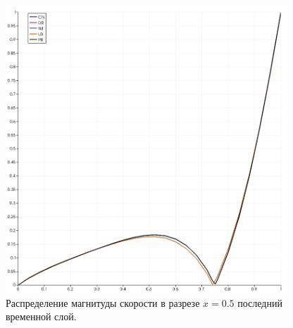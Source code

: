 \documentclass[12pt]{article}
\begin{document}
\begin{figure}
	\begin{center}
		\includegraphics[width=400px]{pics/slice199}
		\caption{Распределение магнитуды скорости в разрезе $x=0.5$ последний временной слой.}
		\label{fg:slice199}
	\end{center}
\end{figure}
\end{document}
